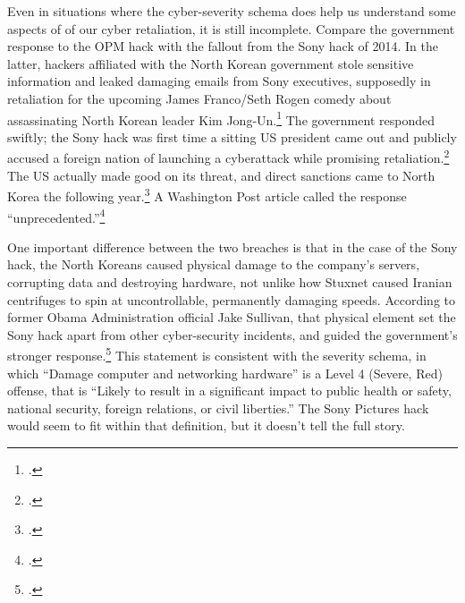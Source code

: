 \documentclass{memoir}
\begin{document}
\begin{refsegment}
Even in situations where the cyber-severity schema does help us understand some aspects of of our cyber retaliation, it is still incomplete. Compare the government response to the OPM hack with the fallout from the Sony hack of 2014. In the latter, hackers affiliated with the North Korean government stole sensitive information and leaked damaging emails from Sony executives, supposedly in retaliation for the upcoming James Franco/Seth Rogen comedy about assassinating North Korean leader Kim Jong-Un.\footcite{barnes_sony_2017} The government responded swiftly; the Sony hack was first time a sitting US president came out and publicly accused a foreign nation of launching a cyberattack while promising retaliation.\footcite{sanger_u.s._2016} The US actually made good on its threat, and direct sanctions came to North Korea the following year.\footcite{lederman_us_2015} A Washington Post article called the response ``unprecedented.''\footcite{nakashima_why_2015}

One important difference between the two breaches is that in the case of the Sony hack, the North Koreans caused physical damage to the company's servers, corrupting data and destroying hardware, not unlike how Stuxnet caused Iranian centrifuges to spin at uncontrollable, permanently damaging speeds. According to former Obama Administration official Jake Sullivan, that physical element set the Sony hack apart from other cyber-security incidents, and guided the government's stronger response.\footcite[Jake Sullivan served as the Deputy Assistant to the President and National Security Advisor to the Vice President. Piror to that, he was the Director of Policy Planning at the State Department.]{sullivan_personal_2019} This statement is consistent with the severity schema, in which ``Damage computer and networking hardware'' is a Level 4 (Severe, Red) offense, that is ``Likely to result in a significant impact to public health or safety, national security, foreign relations, or civil liberties.'' The Sony Pictures hack would seem to fit within that definition, but it doesn't tell the full story.


\end{refsegment}
\end{document}
